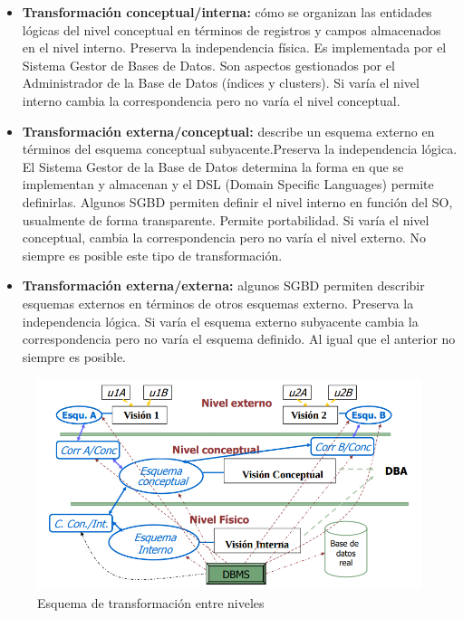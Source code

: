 \documentclass[a4paper,11pt]{article}
\begin{document}
\begin{itemize}
\item \textbf{Transformación conceptual/interna:} cómo se organizan las entidades lógicas del nivel conceptual en términos de registros y campos almacenados en el nivel interno. Preserva la independencia física. Es implementada por el Sistema Gestor de Bases de Datos. Son aspectos gestionados por el Administrador de la Base de Datos (índices y clusters). Si varía el nivel interno cambia la correspondencia pero no varía el nivel conceptual.

\item \textbf{Transformación externa/conceptual:} describe un esquema externo en términos del esquema conceptual subyacente.Preserva la independencia lógica. El Sistema Gestor de la Base de Datos determina la forma en que se implementan y almacenan y el DSL (Domain Specific Languages) permite definirlas. Algunos SGBD permiten definir el nivel interno en función del SO, usualmente de forma transparente. Permite portabilidad. Si varía el nivel conceptual, cambia la correspondencia pero no varía el nivel externo. No siempre es posible este tipo de transformación.

\item \textbf{Transformación externa/externa:} algunos SGBD permiten describir esquemas externos en términos de otros esquemas externo. Preserva la independencia lógica. Si varía el esquema externo subyacente cambia la correspondencia pero no varía el esquema definido. Al igual que el anterior no siempre es posible.
\end{itemize}

\begin{figure}
\includegraphics[scale=0.7]{correspondencia_niveles.png}
\caption{Esquema de transformación entre niveles}
\end{figure}
\end{document}
